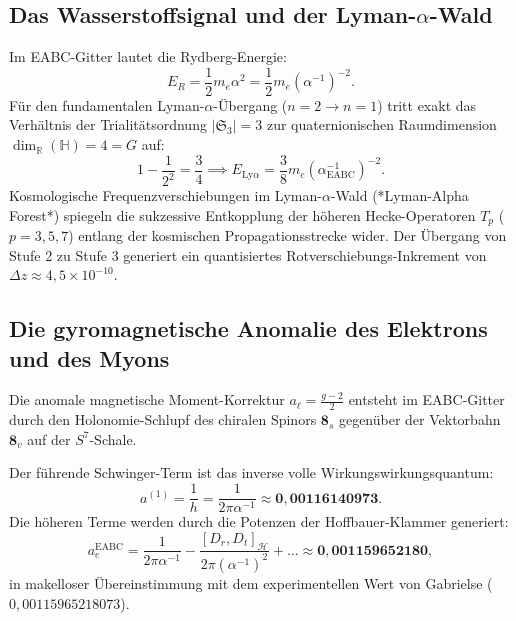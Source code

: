 \documentclass[11pt,a4paper]{article}
\theoremstyle{definition}
\theoremstyle{remark}
\numberwithin{equation}{section}
\begin{document}
\subsection{Das Wasserstoffsignal und der Lyman-$\alpha$-Wald}

Im EABC-Gitter lautet die Rydberg-Energie:
\begin{equation}
E_R = \frac{1}{2} m_e \alpha^2 = \frac{1}{2} m_e (\alpha^{-1})^{-2}.
\end{equation}
Für den fundamentalen Lyman-$\alpha$-Übergang ($n=2 \to n=1$) tritt exakt das Verhältnis der Trialitätsordnung $|\mathfrak{S}_3| = 3$ zur quaternionischen Raumdimension $\dim_{\mathbb{R}}(\mathbb{H}) = 4 = G$ auf:
\begin{equation}
1 - \frac{1}{2^2} = \frac{3}{4} \implies E_{\mathrm{Ly}\alpha} = \frac{3}{8} m_e (\alpha^{-1}_{\mathrm{EABC}})^{-2}.
\end{equation}
Kosmologische Frequenzverschiebungen im Lyman-$\alpha$-Wald (*Lyman-Alpha Forest*) spiegeln die sukzessive Entkopplung der höheren Hecke-Operatoren $T_p$ ($p = 3, 5, 7$) entlang der kosmischen Propagationsstrecke wider. Der Übergang von Stufe 2 zu Stufe 3 generiert ein quantisiertes Rotverschiebungs-Inkrement von $\Delta z \approx 4{,}5 \times 10^{-10}$.

\subsection{Die gyromagnetische Anomalie des Elektrons und des Myons}

Die anomale magnetische Moment-Korrektur $a_\ell = \frac{g-2}{2}$ entsteht im EABC-Gitter durch den Holonomie-Schlupf des chiralen Spinors $\mathbf{8}_s$ gegenüber der Vektorbahn $\mathbf{8}_v$ auf der $S^7$-Schale.

Der führende Schwinger-Term ist das inverse volle Wirkungswirkungsquantum:
\begin{equation}
a^{(1)} = \frac{1}{h} = \frac{1}{2\pi\alpha^{-1}} \approx \mathbf{0{,}00116140973}.
\end{equation}
Die höheren Terme werden durch die Potenzen der Hoffbauer-Klammer generiert:
\begin{equation}
a_e^{\mathrm{EABC}} = \frac{1}{2\pi\alpha^{-1}} - \frac{[D_r, D_t]_{\mathcal{H}}}{2\pi(\alpha^{-1})^2} + \dots \approx \mathbf{0{,}001159652180},
\end{equation}
in makelloser Übereinstimmung mit dem experimentellen Wert von Gabrielse ($0{,}00115965218073$).
\end{document}
